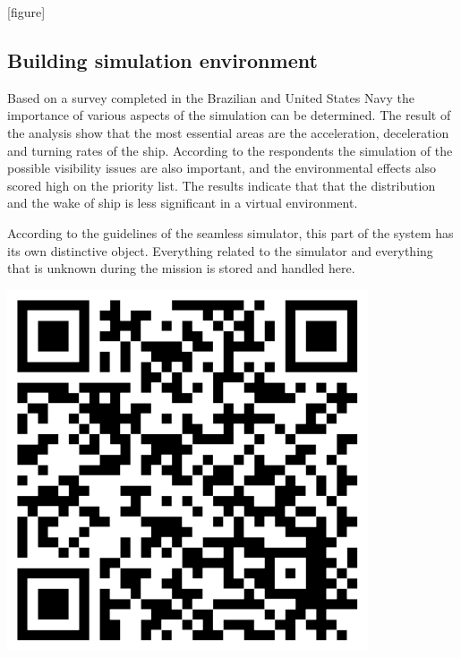 [figure]

\subsection{Building simulation environment}

Based on a survey completed in the Brazilian and United States Navy the importance of various aspects of the simulation can be determined\cite[p.~6]{shipsim}. The result of the analysis show that the most essential areas are the acceleration, deceleration and turning rates of the ship. According to the respondents the simulation of the possible visibility issues are also important, and the environmental effects also scored high on the priority list. The results indicate that that the distribution and the wake of ship is less significant in a virtual environment.

\begin{tcolorbox}[colback=cyan!5,colframe=cyan!40!black,title=Code: Simulator.py \\ https://www.dropbox.com/s/agron9anslev6xw/Simulator.py]
\begin{minipage}{0,6\textwidth}
According to the guidelines of the seamless simulator, this part of the system has its own distinctive object. Everything related to the simulator and everything that is unknown during the mission is stored and handled here.
\end{minipage}
\begin{minipage}{0,35\textwidth}
\raggedleft
\includegraphics[width=0.8\textwidth]{img/simulatorcode}
\end{minipage}
\end{tcolorbox}

